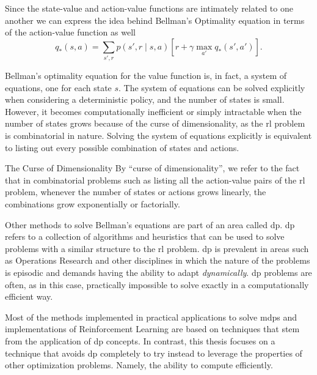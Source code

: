 Since the state-value and action-value functions are intimately related to one
another we can express the idea behind Bellman's Optimality equation in terms of
the action-value function as well
\[
	q_* (s, a) = \sum_{s', r} p(s', r \mid s, a) \left[ r + \gamma \max_{a'} q_{*} (s', a') \right].
\]

Bellman's optimality equation for the value function is, in fact, a system of
equations, one for each state $s$. The system of equations can be solved
explicitly when considering a deterministic policy, and the number of states is
small. However, it becomes computationally inefficient or simply intractable
when the number of states grows because of the curse of dimensionality, as the
\ac{rl} problem is combinatorial in nature. Solving the system of equations
explicitly is equivalent to listing out every possible combination of states and
actions.

\begin{remark}{The Curse of Dimensionality}
	By ``curse of dimensionality'', we refer to the fact that in combinatorial
	problems such as listing all the action-value pairs of the \ac{rl} problem,
	whenever the number of states or actions grows linearly, the combinations
	grow exponentially or factorially.
\end{remark}

Other methods to solve Bellman's equations are part of an area called \acf{dp}.
\Ac{dp} refers to a collection of algorithms and heuristics that can be used to
solve problems with a similar structure to the \ac{rl} problem. \Ac{dp} is
prevalent in areas such as Operations Research and other disciplines in which
the nature of the problems is episodic and demands having the ability to adapt
\textit{dynamically}. \Ac{dp} problems are often, as in this case, practically
impossible to solve exactly in a computationally efficient way.

Most of the methods implemented in practical applications to solve \aclp{mdp}
and implementations of Reinforcement Learning are based on techniques that stem
from the application of \ac{dp} concepts. In contrast, this thesis focuses on a
technique that avoids \ac{dp} completely to try instead to leverage the
properties of other optimization problems. Namely, the ability to compute
efficiently.